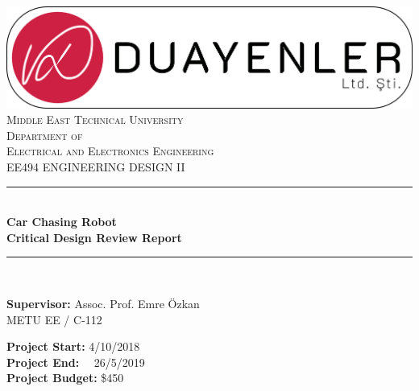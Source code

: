 \documentclass[a4paper,12pt]{article}
\begin{document}
	
	\begin{titlepage}
		
		\newcommand{\HRule}{\rule{\linewidth}{0.5mm}} %
		\centering 
		
		\includegraphics[width=\textwidth,height=\textheight,keepaspectratio]{../../documents/logos/logo3-with-stroke}\\[0.5cm]
		
		\textsc{\LARGE Middle East Technical University}\\[0.5cm] %
		\textsc{\Large Department of \\Electrical and Electronics Engineering }\\[0.5cm] %
		\textsc{\large EE494 ENGINEERING DESIGN II}\\[0.5cm] %
		
		
		\HRule \\[0cm]
		{ \huge \bfseries  Car Chasing Robot\\[0.1cm] \LARGE \bfseries Critical Design Review Report}\\[0cm] %
		\HRule \\[1cm]
		
		\begin{minipage}[l]{0.6\textwidth}
			\raggedright
			\large{\textbf{Supervisor:}}	Assoc. Prof. Emre Özkan \\
			\hspace{3.05cm}  METU EE / C-112
			
		\end{minipage}
		\begin{minipage}[r]{0.35\textwidth}
			\raggedright
			\textbf{Project Start:} 4/10/2018\\
			\textbf{Project End:} \ \  26/5/2019\\
			\textbf{Project Budget:} \$450
			

\end{minipage}
\end{titlepage}
\end{document}
